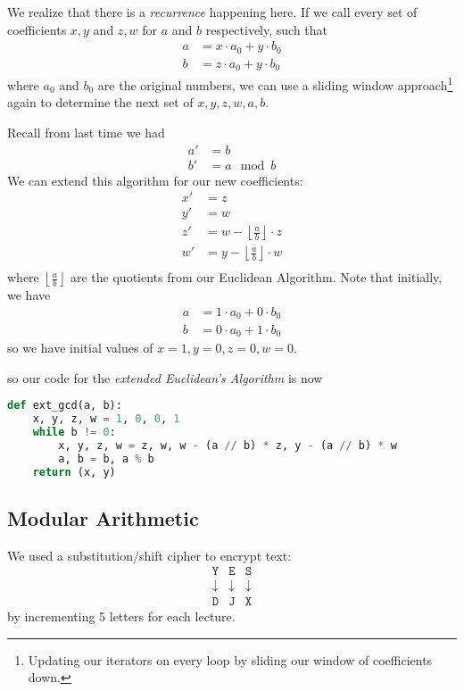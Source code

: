 We realize that there is a \emph{recurrence} happening here. If we call every set of coefficients $x, y$ and $z, w$ for $a$ and $b$ respectively, such that
\begin{align*}
    a & = x\cdot a_0 + y\cdot b_0 \\
    b & = z\cdot a_0 + y\cdot b_0
\end{align*}
where $a_0$ and $b_0$ are the original numbers, we can use a sliding window approach\footnote{Updating our iterators on every loop by sliding our window of coefficients down.} again to determine the next set of $x, y, z, w, a, b$.

Recall from last time we had
\begin{align*}
    a' & = b       \\
    b' & = a\mod b
\end{align*}
We can extend this algorithm for our new coefficients:
\begin{align*}
    x' & = z                                               \\
    y' & = w                                               \\
    z' & = w - \left\lfloor\frac{a}{b}\right\rfloor\cdot z \\
    w' & = y - \left\lfloor\frac{a}{b}\right\rfloor\cdot w \\
\end{align*}
where $\left\lfloor\frac{a}{b}\right\rfloor$ are the quotients from our Euclidean Algorithm. Note that initially, we have
\begin{align*}
    a & = 1\cdot a_0 + 0\cdot b_0 \\
    b & = 0\cdot a_0 + 1\cdot b_0
\end{align*}
so we have initial values of $x=1, y=0, z=0, w=0$.

so our code for the \emph{extended Euclidean's Algorithm} is now
\begin{lstlisting}[language=Python]
def ext_gcd(a, b):
    x, y, z, w = 1, 0, 0, 1
    while b != 0:
        x, y, z, w = z, w, w - (a // b) * z, y - (a // b) * w
        a, b = b, a % b
    return (x, y)
\end{lstlisting}

\subsection{Modular Arithmetic}
\recall We used a substitution/shift cipher to encrypt text:
\[\begin{array}{ccc}
        \mathtt{Y} & \mathtt{E} & \mathtt{S} \\
        \downarrow & \downarrow & \downarrow \\
        \mathtt{D} & \mathtt{J} & \mathtt{X}
    \end{array}\]
by incrementing 5 letters for each lecture.

